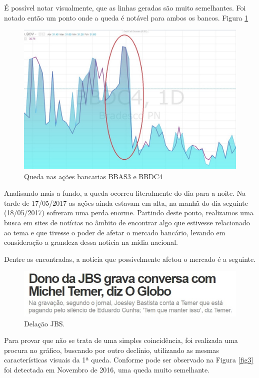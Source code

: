 \documentclass{sigchi}
\begin{document}
É possível notar visualmente, que as linhas geradas são muito semelhantes. Foi notado então um ponto onde a queda é notável para ambos os bancos. Figura \ref{fig2}


 \begin{figure}[!htb]
	\centering
	\includegraphics[scale=0.8]{./figures/figura5.jpg}
	\caption{Queda nas ações bancarias BBAS3 e BBDC4 }
	\label{fig2}
\end{figure}

Analisando mais a fundo, a queda ocorreu literalmente do dia para a noite. Na tarde de 17/05/2017 as ações ainda estavam em alta, na manhã do dia seguinte (18/05/2017) sofreram uma perda enorme. Partindo deste ponto, realizamos uma busca em sites de notícias no âmbito de encontrar algo que estivesse relacionado ao tema e que tivesse o poder de afetar o mercado bancário, levando em consideração a grandeza dessa noticia na mídia nacional.

 Dentre as encontradas, a notícia que possivelmente afetou o mercado é a seguinte.

\begin{figure}[!htb]
	\centering
	\includegraphics[scale=0.4]{./figures/figura3.jpg}
	\caption{Delação JBS.}
	\label{figRotu}
\end{figure}

Para provar que não se trata de uma simples coincidência, foi realizada uma procura no gráfico, buscando por outro declínio, utilizando as mesmas características visuais da 1ª queda. Conforme pode ser observado na Figura \ref{fig3} foi detectada em Novembro de 2016, uma queda muito semelhante.
\end{document}
